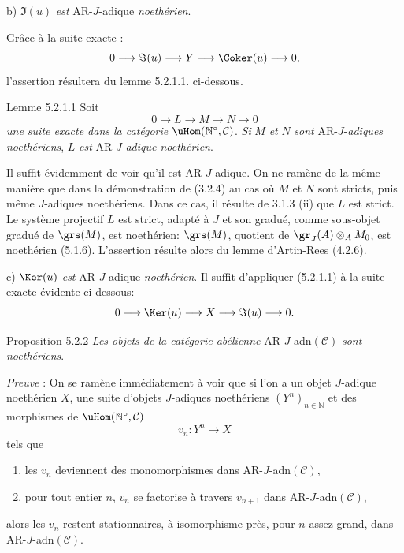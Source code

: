 b) \(\Im(u)\) \emph{est} AR-\(J\)-adique \emph{noethérien}.

Grâce à la suite exacte :
\[
0\longrightarrow \Im(u)\longrightarrow Y\longrightarrow \Coker(u)\longrightarrow 0,
\]
l'assertion résultera du lemme 5.2.1.1. ci-dessous.

\begin{statement}{Lemme 5.2.1.1}
Soit
\[
0\longrightarrow L\longrightarrow M\longrightarrow N\longrightarrow0
\]
\emph{une suite exacte dans la catégorie} \(\uHom(\mathbb{N}^\circ,\mathcal{C})\). \emph{Si} \(M\) \emph{et} \(N\) \emph{sont} AR-\(J\)-\emph{adiques noethériens}, \(L\) \emph{est} AR-\(J\)-\emph{adique noethérien}.
\end{statement}

Il suffit évidemment de voir qu'il est AR-\(J\)-adique. On ne ramène de la même manière que dans la démonstration de (3.2.4) au cas où \(M\) et \(N\) sont stricts, puis même \(J\)-adiques noethériens. Dans ce cas, il résulte de 3.1.3 (ii) que \(L\) est strict. Le système projectif \(L\) est strict, adapté à \(J\) et son gradué, comme sous-objet gradué de \(\grs(M)\), est noethérien: \(\grs(M)\), quotient de \(\gr_J(A)\otimes_A M_0\), est noethérien (5.1.6). L'assertion résulte alors du lemme d'Artin-Rees (4.2.6).

c) \(\Ker(u)\) \emph{est} AR-\(J\)-adique \emph{noethérien}. Il suffit d'appliquer (5.2.1.1) à la suite exacte évidente ci-dessous:
\[
0\longrightarrow \Ker(u)\longrightarrow X\longrightarrow \Im(u)\longrightarrow0.
\]

\begin{statement}{Proposition 5.2.2}
\emph{Les objets de la catégorie abélienne} AR-\(J\)-adn\((\mathcal{C})\) \emph{sont noethériens}.
\end{statement}

\emph{Preuve} : On se ramène immédiatement à voir que si l'on a un objet \(J\)-adique noethérien \(X\), une suite d'objets \(J\)-adiques noethériens \((Y^n)_{n\in\mathbb{N}}\) et des morphismes de \(\uHom(\mathbb{N}^\circ,\mathcal{C})\)
\[
v_n:Y^n\longrightarrow X
\]
tels que
\begin{enumerate}[label=\textup{(\roman*)}]
\item les \(v_n\) deviennent des monomorphismes dans AR-\(J\)-adn\((\mathcal{C})\),
\item pour tout entier \(n\), \(v_n\) se factorise à travers \(v_{n+1}\) dans AR-\(J\)-adn\((\mathcal{C})\),
\end{enumerate}
alors les \(v_n\) restent stationnaires, à isomorphisme près, pour \(n\) assez grand, dans AR-\(J\)-adn\((\mathcal{C})\).

